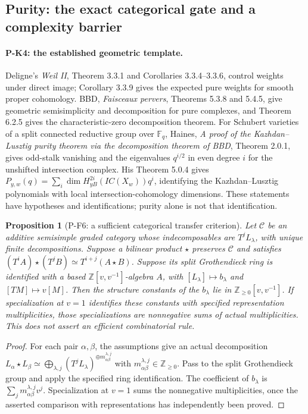 \documentclass[11pt,a4paper]{article}
\newtheorem{proposition}{Proposition}[section]
\begin{document}
\subsection{Purity: the exact categorical gate and a complexity barrier}

\paragraph{P-K4: the established geometric template.}
Deligne's \emph{Weil II}, Theorem 3.3.1 and Corollaries 3.3.4--3.3.6,
control weights under direct image; Corollary 3.3.9 gives the expected
pure weights for smooth proper cohomology. BBD, \emph{Faisceaux pervers}, Theorems 5.3.8 and 5.4.5,
give geometric semisimplicity and decomposition for pure complexes,
and Theorem 6.2.5 gives the characteristic-zero decomposition theorem.
For Schubert varieties of a split connected reductive group over
$\mathbb F_q$, Haines, \emph{A proof of the Kazhdan--Lusztig purity
theorem via the decomposition theorem of BBD}, Theorem 2.0.1,
gives odd-stalk vanishing and the eigenvalues $q^{i/2}$ in even degree
$i$ for the unshifted intersection complex. His Theorem 5.0.4 gives
$P_{y,w}(q)=\sum_i\dim H^{2i}_{yB}(IC(X_w))q^i$, identifying the
Kazhdan--Lusztig polynomials with local intersection-cohomology
dimensions. These statements have hypotheses and identifications;
purity alone is not that identification.

\begin{proposition}[P-F6: a sufficient categorical transfer criterion]
\label{prop:categorical}
Let $\mathcal C$ be an additive semisimple graded category whose
indecomposables are $T^jL_\lambda$, with unique finite decompositions.
Suppose a bilinear product $\star$ preserves $\mathcal C$ and satisfies
$(T^iA)\star(T^jB)\simeq T^{i+j}(A\star B)$.
Suppose its split Grothendieck ring is identified with a based
$\mathbb Z[v,v^{-1}]$-algebra $A$, with $[L_\lambda]\mapsto b_\lambda$
and $[TM]\mapsto v[M]$. Then the structure constants of the
$b_\lambda$ lie in $\mathbb Z_{\ge0}[v,v^{-1}]$.
If specialization at $v=1$ identifies these constants with specified
representation multiplicities, those specializations are nonnegative
sums of actual multiplicities. This does not assert an efficient
combinatorial rule.
\end{proposition}
\begin{proof}
For each pair $\alpha,\beta$, the assumptions give an actual
decomposition
$L_\alpha\star L_\beta\simeq
\bigoplus_{\lambda,j}(T^jL_\lambda)^{\oplus m_{\alpha\beta}^{\lambda,j}}$
with $m_{\alpha\beta}^{\lambda,j}\in\mathbb Z_{\ge0}$.
Pass to the split Grothendieck group and apply the specified ring
identification. The coefficient of $b_\lambda$ is
$\sum_jm_{\alpha\beta}^{\lambda,j}v^j$.
Specialization at $v=1$ sums the nonnegative multiplicities, once the
asserted comparison with representations has independently been proved.
\end{proof}
\end{document}
